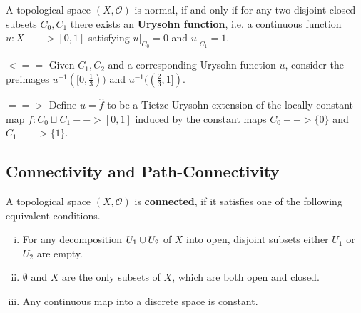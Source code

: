\begin{corollary}
	A topological space $(X,\mathcal{O})$ is normal, if and only if for any two disjoint closed subsets $C_0,C_1$ there exists an \textbf{Urysohn function}, i.e. a continuous function $u:X --> [0,1]$ satisfying $u\vert_{C_0} = 0$ and $u\vert_{C_1} = 1$.
\end{corollary}
\begin{sketch}
	$<==$ Given $C_1,C_2$ and a corresponding Urysohn function $u$, consider the preimages $u^{-1}([0,\frac{1}{3}))$ and $u^{-1}((\frac{2}{3},1])$.

	$==>$ Define $u = \widehat{f}$ to be a Tietze-Urysohn extension of the locally constant map $f:C_0 \sqcup C_1 --> [0,1]$ induced by the constant maps $C_0 --> \{0\}$ and $C_1 --> \{1\}$.
\end{sketch}





\newpage
\subsection{Connectivity and Path-Connectivity}

\begin{definition}
	A topological space $(X, \mathcal{O})$ is \textbf{connected}, if it satisfies one of the following equivalent conditions.
	\begin{enumerate}[(i)]
		\item{
			For any decomposition $U_1 \cup U_2$ of $X$ into open,  disjoint subsets either $U_1$ or $U_2$ are empty.
		}
		\item{
			$\emptyset$ and $X$ are the only subsets of $X$, which are both open and closed.
		}
		\item{
			Any continuous map into a discrete space is constant.
		}
	\end{enumerate}
\end{definition}

